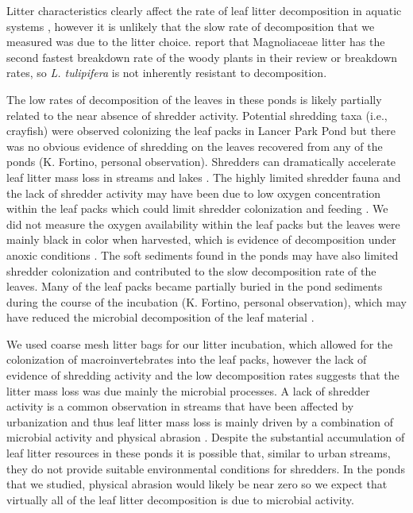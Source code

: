 \documentclass{article}
\providecommand\citet{\cite}
\begin{document}
Litter characteristics clearly affect the rate of leaf litter decomposition in aquatic systems \cite{Webster_1986,Gessner_2010}, however it is unlikely that the slow rate of decomposition that we measured was due to the litter choice. \citet{Webster_1986} report that Magnoliaceae litter has the second fastest breakdown rate of the woody plants in their review or breakdown rates, so \emph{L. tulipifera} is not inherently resistant to decomposition. 

The low rates of decomposition of the leaves in these ponds is likely partially related to the near absence of shredder activity. Potential shredding taxa (i.e., crayfish) were observed colonizing the leaf packs in Lancer Park Pond but there was no obvious evidence of shredding on the leaves recovered from any of the ponds (K. Fortino, personal observation). Shredders can dramatically accelerate leaf litter mass loss in streams \cite{Cummins_1974, Webster_1986, Wallace_1999} and lakes \cite{Bjelke_2005}. The highly limited shredder fauna and the lack of shredder activity may have been due to low oxygen concentration within the leaf packs which could limit shredder colonization and feeding \cite{Bjelke_2005}. We did not measure the oxygen availability within the leaf packs but the leaves were mainly black in color when harvested, which is evidence of decomposition under anoxic conditions \cite{Anderson_1979}. The soft sediments found in the ponds may have also limited shredder colonization and contributed to the slow decomposition rate of the leaves. Many of the leaf packs became partially buried in the pond sediments during the course of the incubation (K. Fortino, personal observation), which may have reduced the microbial decomposition of the leaf material \cite{DANGER_2012}. 

We used coarse mesh litter bags for our litter incubation, which allowed for the colonization of macroinvertebrates into the leaf packs, however the lack of evidence of shredding activity and the low decomposition rates suggests that the litter mass loss was due mainly the microbial processes.  A lack of shredder activity is a common observation in streams that have been affected by urbanization and thus leaf litter mass loss is mainly driven by a combination of microbial activity and physical abrasion \cite{PAUL_2006}. Despite the substantial accumulation of leaf litter resources in these ponds it is possible that, similar to urban streams, they do not provide suitable environmental conditions for shredders. In the ponds that we studied, physical abrasion would likely be near zero so we expect that virtually all of the leaf litter decomposition is due to microbial activity. 
\end{document}
